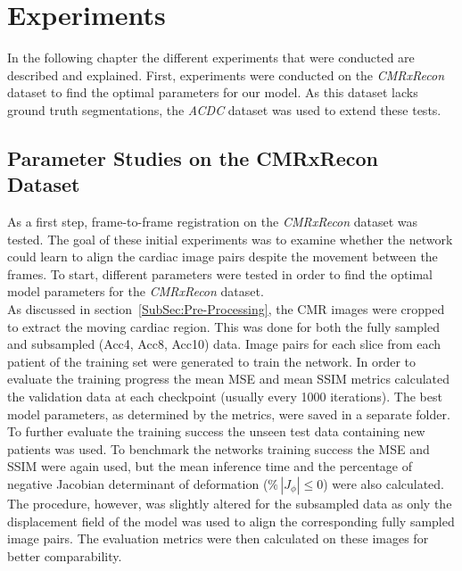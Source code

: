 \documentclass[english,version-2022-01]{uzl-thesis} %
\begin{document}
\chapter{Experiments} \label{Ch:Experiments}
In the following chapter the different experiments that were conducted are described and explained. 
First, experiments were conducted on the \emph{CMRxRecon} dataset to find the optimal parameters for our model. As this dataset lacks ground truth segmentations, the \emph{ACDC} dataset was used to extend these tests.


\section{Parameter Studies on the CMRxRecon Dataset} \label{Sec:ParameterStudies}
As a first step, frame-to-frame registration on the \emph{CMRxRecon} dataset was tested. The goal of these initial experiments was to examine whether the network could learn to align the cardiac image pairs despite the movement between the frames. To start, different parameters were tested in order to find the optimal model parameters for the \emph{CMRxRecon} dataset. 
\\
As discussed in section~\ref{SubSec:Pre-Processing}, the CMR images were cropped to extract the moving cardiac region. This was done for both the fully sampled and subsampled (Acc4, Acc8, Acc10) data. Image pairs for each slice from each patient of the training set were generated to train the network. In order to evaluate the training progress the mean MSE and mean SSIM metrics calculated the validation data at each checkpoint (usually every 1000 iterations). The best model parameters, as determined by the metrics, were saved in a separate folder. To further evaluate the training success the unseen test data containing new patients was used. To benchmark the networks training success the MSE and SSIM were again used, but the mean inference time and the percentage of negative Jacobian determinant of deformation ($\% \, |J_{\phi}|\leq0$) were also calculated. The procedure, however, was slightly altered for the subsampled data as only the displacement field of the model was used to align the corresponding fully sampled image pairs. The evaluation metrics were then calculated on these images for better comparability.
\end{document}
